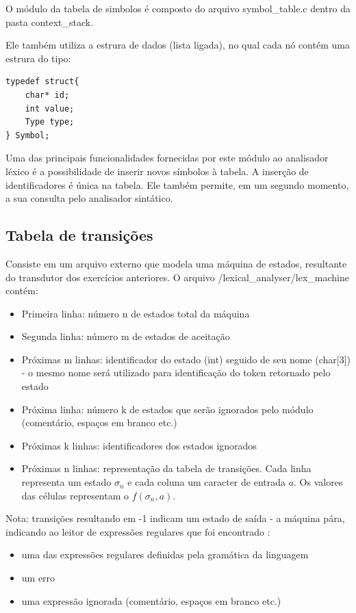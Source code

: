 \documentclass[
	article,			%
	11pt,				%
	oneside,			%
	a4paper,			%
	english,			%
	brazil,				%
	]{abntex2}
\begin{document}
O módulo da tabela de simbolos é composto do arquivo symbol\_table.c dentro da pasta context\_stack.

Ele também utiliza a estrura de dados (lista ligada), no qual cada nó contém uma estrura do tipo:

\lstset{language=C}
\begin{lstlisting}[frame=single]
typedef struct{
    char* id;
    int value;
    Type type;
} Symbol;
\end{lstlisting}

Uma das principais funcionalidades fornecidas por este módulo ao analisador léxico é a possibilidade de inserir novos símbolos à tabela. A inserção de identificadores é única na tabela.
Ele também permite, em um segundo momento, a sua consulta pelo analisador sintático.

\subsection{Tabela de transições}

Consiste em um arquivo externo que modela uma máquina de estados, resultante do transdutor dos exercícios anteriores. 
O arquivo /lexical\_analyser/lex\_machine contém:

\begin{itemize}
	\item Primeira linha: número n de estados total da máquina
	\item Segunda linha: número m de estados de aceitação
	\item Próximas m linhas: identificador do estado (int) seguido de seu nome (char[3]) - o mesmo nome será utilizado para identificação do token retornado pelo estado
	\item Próxima linha: número k de estados que serão ignorados pelo módulo (comentário, espaços em branco etc.)
	\item Próximas k linhas: identificadores dos estados ignorados
	\item Próximas n linhas: representação da tabela de transições. Cada linha representa um estado $\sigma_n$ e cada coluna um caracter de entrada $a$. Os valores das células representam o $f(\sigma_n, a)$.
\end{itemize}

Nota: transições resultando em -1 indicam um estado de saída - a máquina pára, indicando ao leitor de expressões regulares que foi encontrado :

\begin{itemize}
	\item uma das expressões regulares definidas pela gramática da linguagem 
	\item um erro
	\item uma expressão ignorada (comentário, espaços em branco etc.)
\end{itemize}
\end{document}
